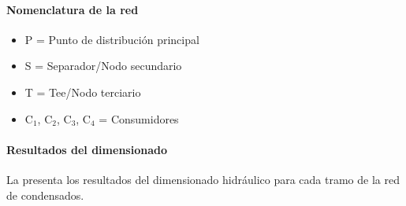 \paragraph{Nomenclatura de la red}

\begin{itemize}[noitemsep]
	\item P = Punto de distribución principal
	\item S = Separador/Nodo secundario
	\item T = Tee/Nodo terciario
	\item C$_1$, C$_2$, C$_3$, C$_4$ = Consumidores
\end{itemize}

\paragraph{Resultados del dimensionado}

La  presenta los resultados del dimensionado hidráulico para cada tramo de la red de condensados.

